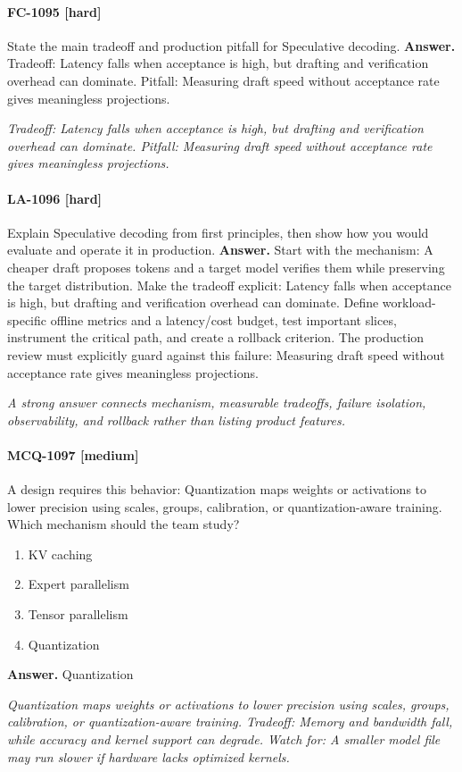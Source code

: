 \paragraph{FC-1095 [hard]} State the main tradeoff and production pitfall for Speculative decoding.
\noindent\textbf{Answer.} Tradeoff: Latency falls when acceptance is high, but drafting and verification overhead can dominate. Pitfall: Measuring draft speed without acceptance rate gives meaningless projections.
\par\textit{Tradeoff: Latency falls when acceptance is high, but drafting and verification overhead can dominate. Pitfall: Measuring draft speed without acceptance rate gives meaningless projections.}
\paragraph{LA-1096 [hard]} Explain Speculative decoding from first principles, then show how you would evaluate and operate it in production.
\noindent\textbf{Answer.} Start with the mechanism: A cheaper draft proposes tokens and a target model verifies them while preserving the target distribution. Make the tradeoff explicit: Latency falls when acceptance is high, but drafting and verification overhead can dominate. Define workload-specific offline metrics and a latency/cost budget, test important slices, instrument the critical path, and create a rollback criterion. The production review must explicitly guard against this failure: Measuring draft speed without acceptance rate gives meaningless projections.
\par\textit{A strong answer connects mechanism, measurable tradeoffs, failure isolation, observability, and rollback rather than listing product features.}
\paragraph{MCQ-1097 [medium]} A design requires this behavior: Quantization maps weights or activations to lower precision using scales, groups, calibration, or quantization-aware training. Which mechanism should the team study?
\begin{enumerate}[label=\Alph*.]
\item KV caching
\item Expert parallelism
\item Tensor parallelism
\item Quantization
\end{enumerate}
\noindent\textbf{Answer.} Quantization
\par\textit{Quantization maps weights or activations to lower precision using scales, groups, calibration, or quantization-aware training. Tradeoff: Memory and bandwidth fall, while accuracy and kernel support can degrade. Watch for: A smaller model file may run slower if hardware lacks optimized kernels.}

